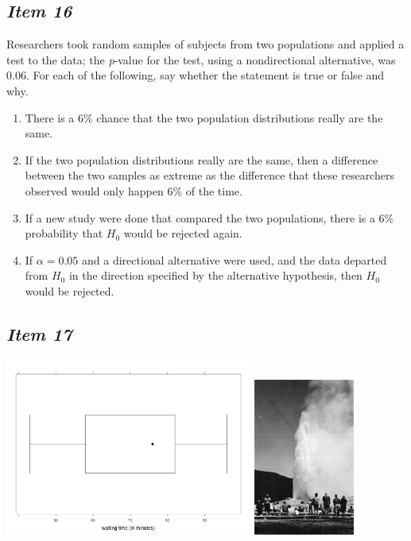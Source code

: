 \subsection{\textbf{\textit{Item 16}}}
Researchers took random samples of subjects from two populations and applied a test to the data; the \textit{p}-value for the test, using a nondirectional alternative, was 0.06.  For each of the following, say whether the statement is true or false and why.
\begin{enumerate}[leftmargin=1cm, itemsep=.2em]
\item There is a 6\% chance that the two population distributions really are the same.
\item If the two population distributions really are the same, then a difference between the two samples as extreme as the difference that these researchers observed would only happen 6\% of the time.
\item If a new study were done that compared the two populations, there is a 6\% probability that $H_0$ would be rejected again.
\item If $\alpha = 0.05$ and a directional alternative were used, and the data departed from $H_0$ in the direction specified by the alternative hypothesis, then $H_0$ would be rejected.
\end{enumerate}

\subsection{\textbf{\textit{Item 17}}}


\noindent
\includegraphics[width=3.2in]{includes/faithful1.png}
   \hspace*{.10in}\includegraphics[width=1.3in]{includes/old-faithful.jpg}

